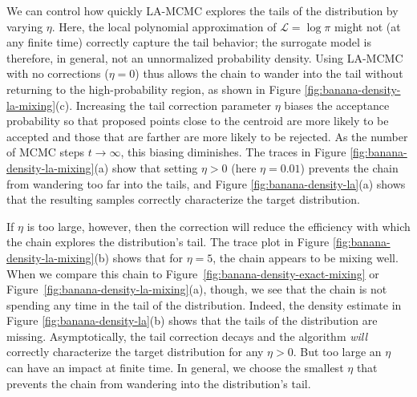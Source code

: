 We can control how quickly LA-MCMC explores the tails of the distribution by varying $\eta$. Here, the local polynomial approximation of $\mathcal{L} = \log \pi$ might not (at any finite time) correctly capture the tail behavior; the surrogate model is therefore, in general, not an unnormalized probability density. 
Using LA-MCMC with no corrections ($\eta=0$) thus allows the chain to wander into the tail without returning to the high-probability region, as shown in Figure \ref{fig:banana-density-la-mixing}(c). Increasing the tail correction parameter $\eta$ biases the acceptance probability so that proposed points close to the centroid are more likely to be accepted and those that are farther are more likely to be rejected. As the number of MCMC steps $t \rightarrow \infty$, this biasing diminishes. The traces in Figure \ref{fig:banana-density-la-mixing}(a) show that setting $\eta > 0$ (here $\eta = 0.01$)  prevents the chain from wandering too far into the tails, and Figure \ref{fig:banana-density-la}(a) shows that the resulting samples correctly characterize the target distribution. 

If $\eta$ is too large, however, then the correction will reduce the efficiency with which the chain explores the distribution's tail. The trace plot in Figure \ref{fig:banana-density-la-mixing}(b) shows that for $\eta=5$, the chain appears to be mixing well. When we compare this chain to Figure~\ref{fig:banana-density-exact-mixing} or Figure~\ref{fig:banana-density-la-mixing}(a), though, we see that the chain is not spending any time in the tail of the distribution. Indeed, the density estimate in Figure \ref{fig:banana-density-la}(b) shows that the tails of the distribution are missing. Asymptotically, the tail correction decays and the algorithm \emph{will} correctly characterize the target distribution for any $\eta > 0$. But too large an $\eta$ can have an impact at finite time. In general, we choose the smallest $\eta$ that prevents the chain from wandering into the distribution's tail.

